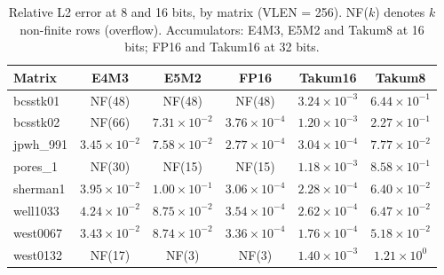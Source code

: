 \begin{table}[t]
\caption{Relative L2 error at 8 and 16 bits, by matrix (VLEN = 256). NF($k$) denotes $k$ non-finite rows (overflow). Accumulators: E4M3, E5M2 and Takum8 at 16 bits; FP16 and Takum16 at 32 bits.}
\label{tab:precisao816}
\centering
\footnotesize
\begin{tabular}{@{}lccccc@{}}
\toprule
Matrix & E4M3 & E5M2 & FP16 & Takum16 & Takum8 \\
\midrule
bcsstk01 & NF(48) & NF(48) & NF(48) & $3.24 \times 10^{-3}$ & $6.44 \times 10^{-1}$ \\
bcsstk02 & NF(66) & $7.31 \times 10^{-2}$ & $3.76 \times 10^{-4}$ & $1.20 \times 10^{-3}$ & $2.27 \times 10^{-1}$ \\
jpwh\_991 & $3.45 \times 10^{-2}$ & $7.58 \times 10^{-2}$ & $2.77 \times 10^{-4}$ & $3.04 \times 10^{-4}$ & $7.77 \times 10^{-2}$ \\
pores\_1 & NF(30) & NF(15) & NF(15) & $1.18 \times 10^{-3}$ & $8.58 \times 10^{-1}$ \\
sherman1 & $3.95 \times 10^{-2}$ & $1.00 \times 10^{-1}$ & $3.06 \times 10^{-4}$ & $2.28 \times 10^{-4}$ & $6.40 \times 10^{-2}$ \\
well1033 & $4.24 \times 10^{-2}$ & $8.75 \times 10^{-2}$ & $3.54 \times 10^{-4}$ & $2.62 \times 10^{-4}$ & $6.47 \times 10^{-2}$ \\
west0067 & $3.43 \times 10^{-2}$ & $8.74 \times 10^{-2}$ & $3.36 \times 10^{-4}$ & $1.76 \times 10^{-4}$ & $5.18 \times 10^{-2}$ \\
west0132 & NF(17) & NF(3) & NF(3) & $1.40 \times 10^{-3}$ & $1.21 \times 10^{0}$ \\
\bottomrule
\end{tabular}
\end{table}
